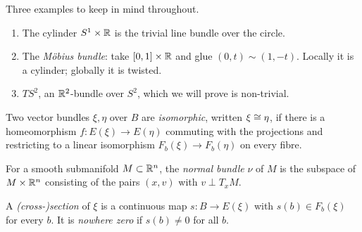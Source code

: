 \begin{example}\label{ex:mobius}
Three examples to keep in mind throughout.

\begin{enumerate}
\item The cylinder $S^1\times\mathbb{R}$ is the trivial line bundle over the circle.

\item The \emph{M\"obius bundle}: take $[0,1]\times\mathbb{R}$ and glue
$(0,t)\sim(1,-t)$. Locally it is a cylinder; globally it is twisted.

\item $TS^2$, an $\mathbb{R}^2$-bundle over $S^2$, which we will prove is non-trivial.
\end{enumerate}

\begin{center}
\end{center}
\end{example}

\begin{definition}
Two vector bundles $\xi,\eta$ over $B$ are \emph{isomorphic}, written
$\xi\cong\eta$, if there is a homeomorphism $f\colon E(\xi)\to E(\eta)$ commuting
with the projections and restricting to a linear isomorphism
$F_b(\xi)\to F_b(\eta)$ on every fibre.
\end{definition}

\begin{definition}
For a smooth submanifold $M\subset\mathbb{R}^n$, the \emph{normal bundle} $\nu$ of $M$
is the subspace of $M\times\mathbb{R}^n$ consisting of the pairs $(x,v)$ with
$v\perp T_xM$.
\end{definition}

\begin{definition}
A \emph{(cross-)section} of $\xi$ is a continuous map $s\colon B\to E(\xi)$ with
$s(b)\in F_b(\xi)$ for every $b$. It is \emph{nowhere zero} if $s(b)\neq0$ for
all $b$.
\end{definition}

